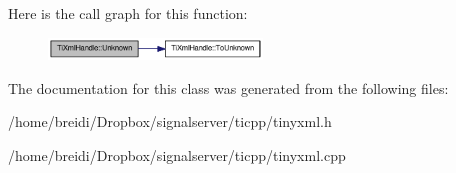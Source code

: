 Here is the call graph for this function:\nopagebreak
\begin{figure}[H]
\begin{center}
\leavevmode
\includegraphics[width=161pt]{class_ti_xml_handle_a49675b74357ba2aae124657a9a1ef465_cgraph}
\end{center}
\end{figure}


The documentation for this class was generated from the following files:\begin{DoxyCompactItemize}
\item 
/home/breidi/Dropbox/signalserver/ticpp/tinyxml.h\item 
/home/breidi/Dropbox/signalserver/ticpp/tinyxml.cpp\end{DoxyCompactItemize}
